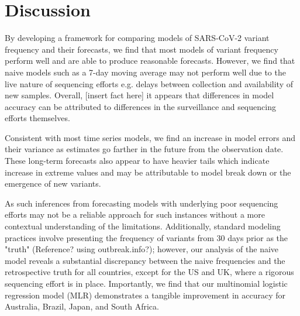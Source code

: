 \documentclass[11pt,oneside,letterpaper]{article}
\begin{document}
\section*{Discussion}




By developing a framework for comparing models of SARS-CoV-2 variant frequency and their forecasts, we find that most models of variant frequency perform well and are able to produce reasonable forecasts.
However, we find that naive models such as a 7-day moving average may not perform well due to the live nature of sequencing efforts e.g. delays between collection and availability of new samples.
Overall, [insert fact here] it appears that differences in model accuracy can be attributed to differences in the surveillance and sequencing efforts themselves.

Consistent with most time series models, we find an increase in model errors and their variance as estimates go farther in the future from the observation date.
These long-term forecasts also appear to have heavier tails which indicate increase in extreme values and may be attributable to model break down or the emergence of new variants.  

%



As such inferences from forecasting models with underlying poor sequencing efforts may not be a reliable approach for such instances without a more contextual understanding of the limitations.
Additionally, standard modeling practices involve presenting the frequency of variants from 30 days prior as the "truth" (Reference? using outbreak.info?); however, our analysis of the naive model reveals a substantial discrepancy between the naive frequencies and the retrospective truth for all countries, except for the US and UK, where a rigorous sequencing effort is in place. 
Importantly, we find that our multinomial logistic regression model (MLR) demonstrates a tangible improvement in accuracy for Australia, Brazil, Japan, and South Africa.
\end{document}
